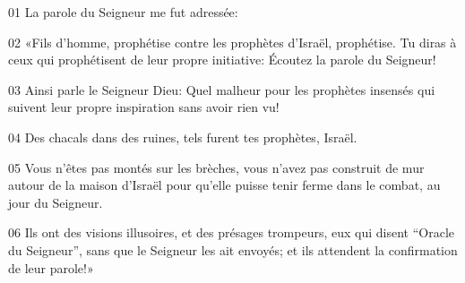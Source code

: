 01 La parole du Seigneur me fut adressée:

02 «Fils d’homme, prophétise contre les prophètes d’Israël, prophétise. Tu diras à ceux qui prophétisent de leur propre initiative: Écoutez la parole du Seigneur!

03 Ainsi parle le Seigneur Dieu: Quel malheur pour les prophètes insensés qui suivent leur propre inspiration sans avoir rien vu!

04 Des chacals dans des ruines, tels furent tes prophètes, Israël.

05 Vous n’êtes pas montés sur les brèches, vous n’avez pas construit de mur autour de la maison d’Israël pour qu’elle puisse tenir ferme dans le combat, au jour du Seigneur.

06 Ils ont des visions illusoires, et des présages trompeurs, eux qui disent “Oracle du Seigneur”, sans que le Seigneur les ait envoyés; et ils attendent la confirmation de leur parole!»
